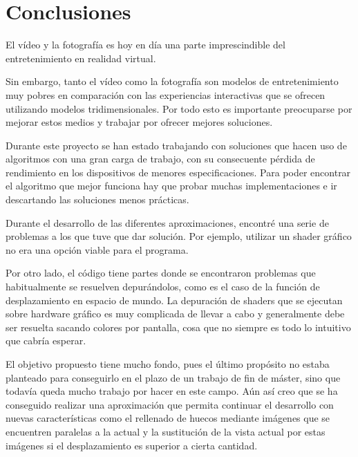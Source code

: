 
\pagestyle{empty}
\chapter {Conclusiones}

El vídeo y la fotografía es hoy en día una parte imprescindible del entretenimiento en  realidad virtual. 

Sin embargo, tanto el vídeo como la fotografía son modelos de entretenimiento muy pobres en comparación con las experiencias interactivas que se ofrecen utilizando modelos tridimensionales. Por todo esto es importante preocuparse por mejorar estos medios y trabajar por ofrecer mejores soluciones.

Durante este proyecto se han estado trabajando con soluciones que hacen uso de algoritmos con una gran carga de trabajo, con su consecuente pérdida de rendimiento en los dispositivos de menores especificaciones. Para poder encontrar el algoritmo que mejor funciona hay que probar muchas implementaciones e ir descartando las soluciones menos prácticas.

Durante el desarrollo de las diferentes aproximaciones, encontré una serie de problemas a los que tuve que dar solución. Por ejemplo, utilizar un shader gráfico no era una opción viable para el programa.

Por otro lado, el código tiene partes donde se encontraron problemas que habitualmente se resuelven depurándolos, como es el caso de la función de desplazamiento en espacio de mundo. La depuración de shaders que se ejecutan sobre hardware gráfico es muy complicada de llevar a cabo y generalmente debe ser resuelta sacando colores por pantalla, cosa que no siempre es todo lo intuitivo que cabría esperar.

El objetivo propuesto tiene mucho fondo, pues el último propósito no estaba planteado para conseguirlo en el plazo de un trabajo de fin de máster, sino que todavía queda mucho trabajo por hacer en este campo. Aún así creo que se ha conseguido realizar una aproximación que permita continuar el desarrollo con nuevas características como el rellenado de huecos mediante imágenes que se encuentren paralelas a la actual y la sustitución de la vista actual por estas imágenes si el desplazamiento es superior a cierta cantidad.

